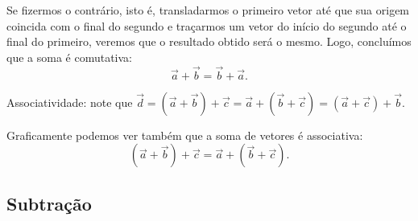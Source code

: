 Se fizermos o contrário, isto é, transladarmos o primeiro vetor até que sua origem coincida com o final do segundo e traçarmos um vetor do início do segundo até o final do primeiro, veremos que o resultado obtido será o mesmo. Logo, concluímos que a soma é comutativa:
\begin{equation}
  \vec{a} + \vec{b} = \vec{b} + \vec{a}.
\end{equation}

\begin{marginfigure}
\centering
{}
\caption{Associatividade: note que $\vec{d} = (\vec{a} + \vec{b}) + \vec{c} = \vec{a} + (\vec{b} + \vec{c}) = (\vec{a} + \vec{c}) + \vec{b}$.}
\end{marginfigure}

Graficamente podemos ver também que a soma de vetores é associativa:
\begin{equation}
  (\vec{a}+\vec{b}) + \vec{c} = \vec{a} + (\vec{b} + \vec{c}).
\end{equation}

\subsection{Subtração}

